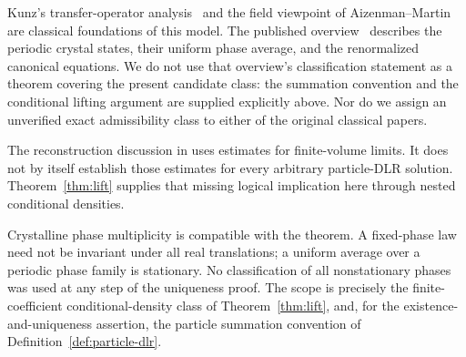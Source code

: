 \documentclass[11pt,reqno]{amsart}
\theoremstyle{definition}
\theoremstyle{remark}
\newcommand{\1}{\mathbf 1}
\numberwithin{equation}{section}
\begin{document}
Kunz's transfer-operator analysis~\cite{Kunz} and the field viewpoint
of Aizenman--Martin~\cite{AM} are classical foundations of this model.
The published overview~\cite[Section~VI.A.2.e]{Lewin} describes the
periodic crystal states, their uniform phase average, and the
renormalized canonical equations. We do not use that overview's
classification statement as a theorem covering the present candidate
class: the summation convention and the conditional lifting argument
are supplied explicitly above. Nor do we assign an unverified exact
admissibility class to either of the original classical papers.

The reconstruction discussion in \cite[Section~5, equations~(30)--(32)
and the ensuing remarks]{AJJ} uses estimates for finite-volume limits.
It does not by itself establish those estimates for every arbitrary
particle-DLR solution. Theorem~\ref{thm:lift} supplies that missing
logical implication here through nested conditional densities.

Crystalline phase multiplicity is compatible with the theorem. A
fixed-phase law need not be invariant under all real translations; a
uniform average over a periodic phase family is stationary. No
classification of all nonstationary phases was used at any step of the
uniqueness proof. The scope is precisely the finite-coefficient
conditional-density class of Theorem~\ref{thm:lift}, and, for the
existence-and-uniqueness assertion, the particle summation convention
of Definition~\ref{def:particle-dlr}.
\end{document}
